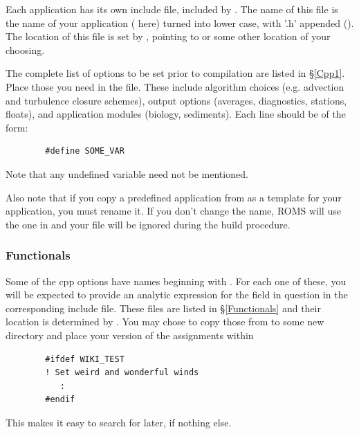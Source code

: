 Each application has its own include file, included by
. The name of this file is the name of your
application ( here) turned into lower case, with '.h'
appended (). The location of this file is set by
, pointing to  or some other
location of your choosing.

The complete list of options to be set prior to compilation are listed in
\S\ref{Cpp1}. Place those you need in the  file. These
include algorithm choices (e.g. advection and turbulence closure schemes),
output options (averages, diagnostics, stations, floats), and
application modules (biology, sediments). Each line should be of the
form:
\begin{verbatim}
        #define SOME_VAR
\end{verbatim}
Note that any undefined variable need not be mentioned.

Also note that if you copy a predefined application from
 as a template for your application, you must
rename it. If you don't change the name, ROMS will use the one in
 and your file will be ignored during the build
procedure.

\subsubsection{Functionals}

Some of the cpp options have names beginning with . For each one of
these, you will be expected to provide an analytic expression for the field
in question in the corresponding include file. These files
are listed in \S\ref{Functionals} and their location is determined
by . You may chose to copy those from
 to some new directory and place your version of
the assignments within
\begin{verbatim}
        #ifdef WIKI_TEST
        ! Set weird and wonderful winds
           :
        #endif
\end{verbatim}
This makes
it easy to search for later, if nothing else.

\subsubsection{}


